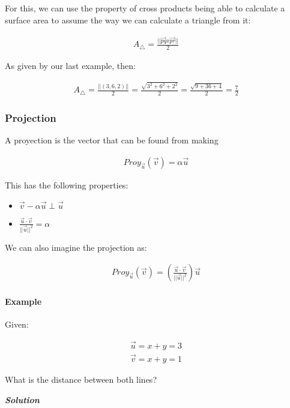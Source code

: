 \documentclass[11pt,fleqn]{book} %
\begin{document}
For this, we can use the property of cross products being able to calculate a surface area to assume the way we can calculate a triangle from it:

\begin{gather}
    A_\triangle = \frac{||\vec{pq}x\vec{pr}||}{2}
\end{gather}

As given by our last example, then:

\begin{gather}
    A_\triangle = \frac{||(3,6,2)||}{2} = \frac{\sqrt{3^2+6^2+2^2}}{2} = \frac{\sqrt{9+36+4}}{2} = \frac{7}{2} 
\end{gather}


\subsubsection{Projection}

A proyection is the vector that can be found from making 

\begin{gather}
    Proy_{\vec{u}}(\vec{v}) = \alpha \vec{u}
\end{gather}

This has the following properties:

\begin{itemize}
    \item $ \vec{v} - \alpha \vec{u} \perp \vec{u} $
    \item $ \frac{\vec{u} \cdot \vec{v}}{||\vec{u}||^2} = \alpha $
\end{itemize}

We can also imagine the projection as:

\begin{gather}
    Proy_{\vec{u}}(\vec{v}) = (\frac{\vec{u}\cdot\vec{v}}{||\vec{u}||^2})\vec{u}
\end{gather}

\paragraph*{Example}

Given:

\begin{gather}
    \vec{u} = x+y=3\\
    \vec{v} = x+y=1
\end{gather}

What is the distance between both lines?

\textit{\textbf{Solution}}
\end{document}

